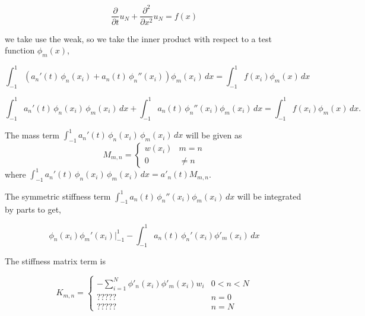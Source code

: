 \documentclass[12pt]{article}%
\begin{document}
\[ \frac{\partial}{\partial t}  u_N+\frac{\partial ^2}{\partial x ^2}u_N=f(x)\]

we take use the weak, so we take the inner product with respect to a test function $\phi_m(x)$,

\[\int_{-1}^{1} \left(a_n'(t)\,\phi_n(x_i) + a_n(t)\,\phi_n''(x_i)\right) \phi_m(x_i)\,dx=\int_{-1}^{1} f(x_i)\phi_m(x)\,dx\]

\[\int_{-1}^{1} a_n'(t)\,\phi_n(x_i)\,\phi_m(x_i)\,dx + \int_{-1}^{1}a_n(t)\,\phi_n''(x_i) \phi_m(x_i)\,dx=\int_{-1}^{1} f(x_i)\phi_m(x)\,dx.\]

The mass term $\int_{-1}^{1} a_n'(t)\, \phi_n(x_i)\,
\phi_m(x_i)\,dx$ will be given as  
\[M_{m,n}=\begin{cases} w(x_i)& m=n \\ 0 & \neq n\end{cases}\]
where $\int_{-1}^{1} a_n'(t)\, \phi_n(x_i)\,
\phi_m(x_i)\,dx=a'_n(t)M_{m,n}$.


The symmetric stiffness term $\int_{-1}^{1}a_n(t)\,\phi_n''(x_i) \phi_m(x_i)\,dx$ will be integrated by parts to get,

\[\phi_n(x_i) \phi_m'(x_i)\Big|_{-1}^1-\int_{-1}^{1}a_n(t)\,\phi_n'(x_i) \phi'_m(x_i)\,dx\]

The stiffness matrix term is

\[K_{m,n}=\begin{cases}
-\sum_{i=1}^N\phi'_n(x_i)\phi'_m(x_i)w_i &  0<n<N
\\
????? &  n=0\\
????? &  n=N
\end{cases}\]
\end{document}
